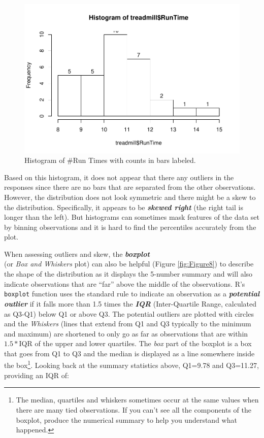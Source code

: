 \documentclass[]{book}
\let\rmarkdownfootnote\footnote%
\def\footnote{\protect\rmarkdownfootnote}
\begin{document}
\begin{figure}[htbp]
\centering
\includegraphics{GreenwoodBanner_files/figure-latex/Figure7-1.pdf}
\caption{\label{fig:Figure7}Histogram of \#Run Times with counts in bars labeled.}
\end{figure}

Based on this histogram, it does not appear that there any outliers in
the responses since there are no bars that are separated from the other
observations. However, the distribution does not look symmetric and
there might be a skew to the distribution. Specifically, it appears to
be \textbf{\emph{skewed right}} (the right tail is longer than the
left). But histograms can sometimes mask features of the data set by
binning observations and it is hard to find the percentiles accurately
from the plot.

When assessing outliers and skew, the \textbf{\emph{boxplot}}\\
(or \emph{Box and Whiskers} plot) can also be helpful (Figure
\ref{fig:Figure8}) to describe the shape of the distribution as it
displays the 5-number summary and will also indicate observations that
are ``far'' above the middle of the observations. R's \texttt{boxplot}
function uses the standard rule to indicate an observation as a
\textbf{\emph{potential outlier}} if it falls more than 1.5 times the
\textbf{\emph{IQR}} (Inter-Quartile Range, calculated as Q3-Q1) below Q1
or above Q3. The potential outliers are plotted with circles and the
\emph{Whiskers} (lines that extend from Q1 and Q3 typically to the
minimum and maximum) are shortened to only go as far as observations
that are within \(1.5*\)IQR of the upper and lower quartiles. The
\emph{box} part of the boxplot is a box that goes from Q1 to Q3 and the
median is displayed as a line somewhere inside the box\footnote{The
  median, quartiles and whiskers sometimes occur at the same values when
  there are many tied observations. If you can't see all the components
  of the boxplot, produce the numerical summary to help you understand
  what happened.}. Looking back at the summary statistics above, Q1=9.78
and Q3=11.27, providing an IQR of:
\end{document}
